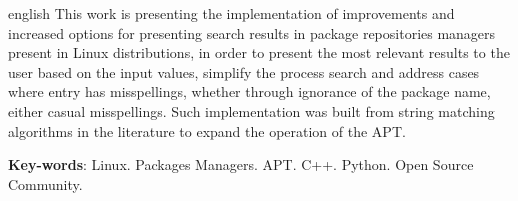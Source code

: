 \begin{resumo}[Abstract]
 \begin{otherlanguage*}{english}
   This work is presenting the implementation of improvements and increased options for presenting search results in package repositories managers present in Linux distributions, in order to present the most relevant results to the user based on the input values, simplify the process search and address cases where entry has misspellings, whether through ignorance of the package name, either casual misspellings. Such implementation was built from string matching algorithms in the literature to expand the operation of the APT.

   \vspace{\onelineskip}
 
   \noindent 
   \textbf{Key-words}: Linux. Packages Managers. APT. C++. Python. Open Source Community.
 \end{otherlanguage*}
\end{resumo}
